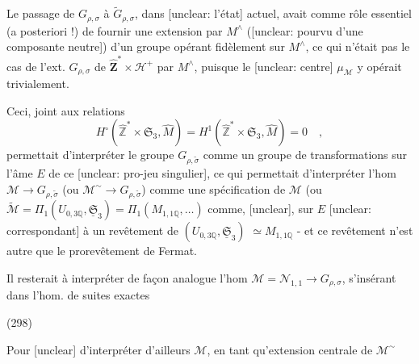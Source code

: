 Le passage de $G_{\rho,\sigma}$ à $\tilde{G}_{\rho,\sigma}$, dans [unclear: l'état] actuel, avait comme rôle essentiel (a posteriori !) de fournir une extension par $M^\wedge$ ([unclear: pourvu d'une composante neutre]) d'un groupe opérant fidèlement sur $M^\wedge$, ce qui n'était pas le cas de l'ext. $G_{\rho,\sigma}$ de $\hat{\mathbf{Z}}^* \times \mathcal{H}^+$ par $M^\wedge$, puisque le [unclear: centre] $\mu_{\mathcal{M}}$ y opérait trivialement.

\newpage


Ceci, joint aux relations
$$H^\circ(\hat{\mathbb{Z}}^* \times \mathfrak{S}_3, \hat{M}) = H^1(\hat{\mathbb{Z}}^* \times \mathfrak{S}_3, \hat{M}) = 0 \quad,$$
permettait d'interpréter le groupe
$G_{\rho, \tilde{\sigma}}$ comme un groupe de transformations
sur l'âme $E$ de ce [unclear: pro-jeu singulier],
ce qui permettait d'interpréter
l'hom $\mathcal{M} \to G_{\rho, \tilde{\sigma}}$ (ou $\mathcal{M}^\sim \to G_{\rho, \tilde{\sigma}}$)
comme une spécification de $\mathcal{M}$
(ou $\tilde{\mathcal{M}} = \Pi_1(U_{0,3 \mathbb{Q}}, \underline{\mathfrak{S}}_3) = \Pi_1(M_{1,1 \mathbb{Q}}, \dots)$
comme, [unclear], sur $E$ [unclear: correspondant]
à un revêtement de $(U_{0,3 \mathbb{Q}}, \underline{\mathfrak{S}}_3)$
$\simeq M_{1,1 \mathbb{Q}}$ - et ce revêtement
n'est autre que le prorevêtement
de Fermat.

Il resterait à interpréter de façon
analogue l'hom $\mathcal{M} = \mathcal{N}_{1,1} \to G_{\rho, \sigma}$,
s'insérant dans l'hom. de suites exactes

(298)

Pour [unclear] d'interpréter d'ailleurs
$\mathcal{M}$, en tant qu'extension centrale de $\mathcal{M}^\sim$

\newpage


